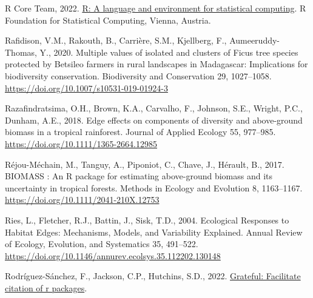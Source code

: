 \documentclass[
  12pt,
]{article}
\newlength{\cslhangindent}
\newlength{\cslentryspacingunit} %
\newenvironment{CSLReferences}[2] %
 {%
  \setlength{\parindent}{0pt}
  \ifodd #1
  \let\oldpar\par
  \def\par{\hangindent=\cslhangindent\oldpar}
  \fi
  \setlength{\parskip}{#2\cslentryspacingunit}
 }%
 {}
\begin{document}
\begin{CSLReferences}{1}{0}
\leavevmode{}%
R Core Team, 2022. \href{https://www.R-project.org/}{R: A language and environment for statistical computing}. R Foundation for Statistical Computing, Vienna, Austria.

\leavevmode{}%
Rafidison, V.M., Rakouth, B., Carrière, S.M., Kjellberg, F., Aumeeruddy-Thomas, Y., 2020. Multiple values of isolated and clusters of {Ficus} tree species protected by {Betsileo} farmers in rural landscapes in {Madagascar}: Implications for biodiversity conservation. Biodiversity and Conservation 29, 1027--1058. \url{https://doi.org/10.1007/s10531-019-01924-3}

\leavevmode{}%
Razafindratsima, O.H., Brown, K.A., Carvalho, F., Johnson, S.E., Wright, P.C., Dunham, A.E., 2018. Edge effects on components of diversity and above-ground biomass in a tropical rainforest. Journal of Applied Ecology 55, 977--985. \url{https://doi.org/10.1111/1365-2664.12985}

\leavevmode{}%
Réjou-Méchain, M., Tanguy, A., Piponiot, C., Chave, J., Hérault, B., 2017. {BIOMASS} : An {R} package for estimating above-ground biomass and its uncertainty in tropical forests. Methods in Ecology and Evolution 8, 1163--1167. \url{https://doi.org/10.1111/2041-210X.12753}

\leavevmode{}%
Ries, L., Fletcher, R.J., Battin, J., Sisk, T.D., 2004. Ecological {Responses} to {Habitat Edges}: {Mechanisms}, {Models}, and {Variability Explained}. Annual Review of Ecology, Evolution, and Systematics 35, 491--522. \url{https://doi.org/10.1146/annurev.ecolsys.35.112202.130148}

\leavevmode{}%
Rodríguez-Sánchez, F., Jackson, C.P., Hutchins, S.D., 2022. \href{https://github.com/Pakillo/grateful}{Grateful: Facilitate citation of r packages}.


\end{CSLReferences}
\end{document}

